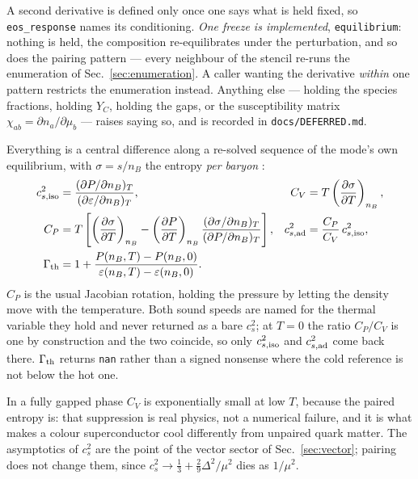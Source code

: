 \documentclass[aps,prc,onecolumn,superscriptaddress,nofootinbib,10pt]{revtex4-2}
\newcommand{\nB}{n_B}
\begin{document}
A second derivative is defined only once one says what is held fixed, so
\texttt{eos\_response} names its conditioning. \emph{One freeze is
implemented}, \texttt{equilibrium}: nothing is held, the composition
re-equilibrates under the perturbation, and so does the pairing pattern ---
every neighbour of the stencil re-runs the enumeration of
Sec.~\ref{sec:enumeration}. A caller wanting the derivative \emph{within} one
pattern restricts the enumeration instead. Anything else --- holding the
species fractions, holding $Y_C$, holding the gaps, or the susceptibility
matrix $\chi_{ab} = \partial n_a/\partial\mu_b$ --- raises saying so, and is
recorded in \texttt{docs/DEFERRED.md}.

Everything is a central difference along a re-solved sequence of the mode's own
equilibrium, with $\sigma = s/\nB$ the entropy \emph{per baryon}
\cite{TypelCompOSE2015}:
\begin{align}
  c_{s,\rm iso}^2 &= \frac{(\partial P/\partial \nB)_T}
                          {(\partial \varepsilon/\partial \nB)_T} ,
  &
  C_V &= T \left(\frac{\partial \sigma}{\partial T}\right)_{\nB} ,
  \label{eq:resp1}\\
  C_P &= T\left[ \left(\frac{\partial \sigma}{\partial T}\right)_{\nB}
        - \left(\frac{\partial P}{\partial T}\right)_{\nB}
          \frac{(\partial \sigma/\partial \nB)_T}{(\partial P/\partial \nB)_T}
        \right] ,
  &
  c_{s,\rm ad}^2 &= \frac{C_P}{C_V}\, c_{s,\rm iso}^2 ,
  \label{eq:resp2}\\
  \Gamma_{\rm th} &= 1 + \frac{P(\nB,T) - P(\nB,0)}
                              {\varepsilon(\nB,T) - \varepsilon(\nB,0)} .
  &&
  \label{eq:resp3}
\end{align}
$C_P$ is the usual Jacobian rotation, holding the pressure by letting the
density move with the temperature. Both sound speeds are named for the thermal
variable they hold and never returned as a bare $c_s^2$; at $T = 0$ the ratio
$C_P/C_V$ is one by construction and the two coincide, so only
$c_{s,\rm iso}^2$ and $c_{s,\rm ad}^2$ come back there. $\Gamma_{\rm th}$
returns \texttt{nan} rather than a signed nonsense where the cold reference is
not below the hot one.

In a fully gapped phase $C_V$ is exponentially small at low $T$, because the
paired entropy is: that suppression is real physics, not a numerical failure,
and it is what makes a colour superconductor cool differently from unpaired
quark matter. The asymptotics of $c_s^2$ are the point of the vector sector of
Sec.~\ref{sec:vector}; pairing does not change them, since
$c_s^2 \to \tfrac13 + \tfrac29 \Delta^2/\mu^2$ dies as $1/\mu^2$.
\end{document}
